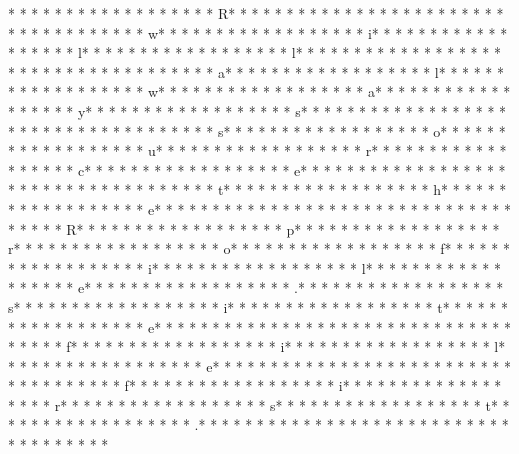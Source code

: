 * * *  * * *  * * *  *  * * *  *  * * *  * R* * *  * * *  * * *  *  * * *  *  * * *  *  * * *  * * *  * * *  *  * * *  *  * * *  * w* * *  * * *  * * *  *  * * *  *  * * *  * i* * *  * * *  * * *  *  * * *  *  * * *  * l* * *  * * *  * * *  *  * * *  *  * * *  * l* * *  * * *  * * *  *  * * *  *  * * *  *  * * *  * * *  * * *  *  * * *  *  * * *  * a* * *  * * *  * * *  *  * * *  *  * * *  * l* * *  * * *  * * *  *  * * *  *  * * *  * w* * *  * * *  * * *  *  * * *  *  * * *  * a* * *  * * *  * * *  *  * * *  *  * * *  * y* * *  * * *  * * *  *  * * *  *  * * *  * s* * *  * * *  * * *  *  * * *  *  * * *  *  * * *  * * *  * * *  *  * * *  *  * * *  * s* * *  * * *  * * *  *  * * *  *  * * *  * o* * *  * * *  * * *  *  * * *  *  * * *  * u* * *  * * *  * * *  *  * * *  *  * * *  * r* * *  * * *  * * *  *  * * *  *  * * *  * c* * *  * * *  * * *  *  * * *  *  * * *  * e* * *  * * *  * * *  *  * * *  *  * * *  *  * * *  * * *  * * *  *  * * *  *  * * *  * t* * *  * * *  * * *  *  * * *  *  * * *  * h* * *  * * *  * * *  *  * * *  *  * * *  * e* * *  * * *  * * *  *  * * *  *  * * *  *  * * *  * * *  * * *  *  * * *  *  * * *  * R* * *  * * *  * * *  *  * * *  *  * * *  * p* * *  * * *  * * *  *  * * *  *  * * *  * r* * *  * * *  * * *  *  * * *  *  * * *  * o* * *  * * *  * * *  *  * * *  *  * * *  * f* * *  * * *  * * *  *  * * *  *  * * *  * i* * *  * * *  * * *  *  * * *  *  * * *  * l* * *  * * *  * * *  *  * * *  *  * * *  * e* * *  * * *  * * *  *  * * *  *  * * *  * .* * *  * * *  * * *  *  * * *  *  * * *  * s* * *  * * *  * * *  *  * * *  *  * * *  * i* * *  * * *  * * *  *  * * *  *  * * *  * t* * *  * * *  * * *  *  * * *  *  * * *  * e* * *  * * *  * * *  *  * * *  *  * * *  *  * * *  * * *  * * *  *  * * *  *  * * *  * f* * *  * * *  * * *  *  * * *  *  * * *  * i* * *  * * *  * * *  *  * * *  *  * * *  * l* * *  * * *  * * *  *  * * *  *  * * *  * e* * *  * * *  * * *  *  * * *  *  * * *  *  * * *  * * *  * * *  *  * * *  *  * * *  * f* * *  * * *  * * *  *  * * *  *  * * *  * i* * *  * * *  * * *  *  * * *  *  * * *  * r* * *  * * *  * * *  *  * * *  *  * * *  * s* * *  * * *  * * *  *  * * *  *  * * *  * t* * *  * * *  * * *  *  * * *  *  * * *  * .* * *  * * *  * * *  *  * * *  *  * * *  *  * * *  * * *  * * *  *  * * *  *  * * *  * 
